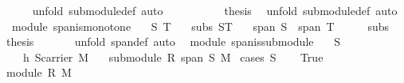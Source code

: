 \begin{isabellebody}
\ \ \ \ \isamarkupfalse%
\ {\isacharparenleft}unfold\ submodule{\isacharunderscore}def{\isacharcomma}\ auto{\isacharparenright}\isanewline
\ \ \isamarkupfalse%
\ {}\ {}\ {}\ {}\ {}\ \isamarkupfalse%
\ {\isacharquery}thesis\ \isamarkupfalse%
\ {\isacharparenleft}unfold\ submodule{\isacharunderscore}def{\isacharcomma}\ auto{\isacharparenright}\isanewline
{}\isamarkupfalse%
%
\endisatagproof
{\isafoldproof}%
%
\isadelimproof
\isanewline
%
\endisadelimproof
\isanewline
{}\isamarkupfalse%
\ {\isacharparenleft}\ module{\isacharparenright}\ span{\isacharunderscore}is{\isacharunderscore}monotone{\isacharcolon}\isanewline
\ \ \ S\ T\isanewline
\ \ \ subs{\isacharcolon}\ {\isachardoublequoteopen}S{\isasymsubseteq}T{\isachardoublequoteclose}\isanewline
\ \ \ {\isachardoublequoteopen}span\ S\ {\isasymsubseteq}\ span\ T{\isachardoublequoteclose}\isanewline
%
\isadelimproof
%
\endisadelimproof
%
\isatagproof
{}\isamarkupfalse%
\ {\isacharminus}\isanewline
\ \ \isamarkupfalse%
\ subs\ \isamarkupfalse%
\ {\isacharquery}thesis\ \isanewline
\ \ \ \ \isamarkupfalse%
\ {\isacharparenleft}unfold\ span{\isacharunderscore}def{\isacharcomma}\ auto{\isacharparenright}\isanewline
{}\isamarkupfalse%
%
\endisatagproof
{\isafoldproof}%
%
\isadelimproof
\isanewline
%
\endisadelimproof
\isanewline
\isanewline
{}\isamarkupfalse%
\ {\isacharparenleft}\ module{\isacharparenright}\ span{\isacharunderscore}is{\isacharunderscore}submodule{\isacharcolon}\isanewline
\ \ \ S\isanewline
\ \ \ \ h{}{\isacharcolon}\ {\isachardoublequoteopen}S{\isasymsubseteq}carrier\ M{\isachardoublequoteclose}\isanewline
\ \ \ {\isachardoublequoteopen}submodule\ R\ {\isacharparenleft}span\ S{\isacharparenright}\ M{\isachardoublequoteclose}\isanewline
%
\isadelimproof
%
\endisadelimproof
%
\isatagproof
{}\isamarkupfalse%
\ {\isacharparenleft}cases\ {\isachardoublequoteopen}S{\isacharequal}{\isacharbraceleft}{\isacharbraceright}{\isachardoublequoteclose}{\isacharparenright}\isanewline
\ \ \isamarkupfalse%
\ True\isanewline
\ \ \isamarkupfalse%
\ \isamarkupfalse%
\ {\isachardoublequoteopen}module\ R\ M{\isachardoublequoteclose}\isacommand{{\isachardot}{\isachardot}}\isamarkupfalse%

\end{isabellebody}
